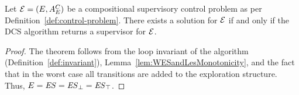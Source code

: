 \begin{theorem}
Let $\mathcal{E} = (E,A_E^C)$ be a compositional supervisory control problem as per Definition~\ref{def:control-problem}. There exists a solution for $\mathcal{E}$ if and only if the DCS algorithm returns a supervisor for $\mathcal{E}$.
\end{theorem}

\begin{proof}
The theorem follows from the loop invariant of the algorithm 
(Definition~\ref{def:invariant}),  
Lemma~\ref{lem:WESandLesMonotonicity}, and 
the fact that in the worst case all transitions are added to the 
exploration structure. Thus,  $E = \mathit{ES} = 
\mathit{\mathit{ES}_{\bot}} = \mathit{\mathit{ES}_{\top}}$.
\end{proof}